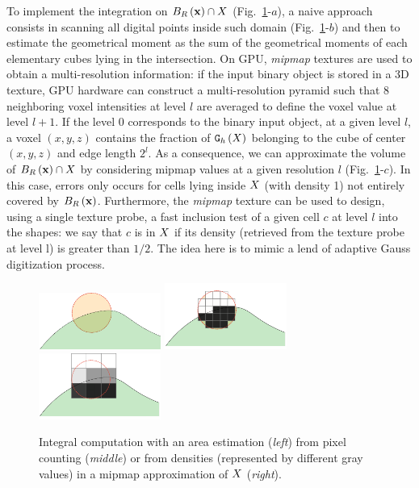 \documentclass{llncs}
\begin{document}
To implement the integration on $B_{R}\left(\mathbf{x}\right) \cap X$
(Fig.~\ref{fig:approx}-$a$), a naive approach consists in scanning all digital
points inside such domain (Fig.~\ref{fig:approx}-$b$) and then to estimate the
geometrical moment as the sum of the geometrical moments of each elementary
cubes lying in the intersection. On GPU, \emph{mipmap} textures are used to
obtain a multi-resolution information: if the input binary object is stored in a
3D texture, GPU hardware can construct a multi-resolution pyramid such that 8
neighboring voxel intensities at level $l$ are averaged to define the voxel
value at level $l+1$. If the level 0 corresponds to the binary input object, at
a given level $l$, a voxel $(x,y,z)$ contains the fraction of $\mathtt{G}_{h}\left(X\right)$ belonging
to the cube of center $(x,y,z)$ and edge length $2^l$. As a consequence, we can
approximate the volume of $B_{R}\left(\mathbf{x}\right)\cap X$ by considering mipmap values
at a given resolution $l$ (Fig.~\ref{fig:approx}-$c$). In this case, errors only
occurs for cells lying inside $X$ (with density 1) not entirely covered by
$B_{R}\left(\mathbf{x}\right)$. Furthermore, the \emph{mipmap} texture can be used to design,
using a single texture probe, a fast inclusion test of a given cell $c$ at level
$l$ into the shapes: we say that $c$ is in $X$ if its density (retrieved
from the texture probe at level l) is greater than $1/2$. The idea here is to
mimic a lend of adaptive Gauss digitization process.

\begin{figure}
  \vspace{-0.35cm}
  \begin{center}
    {\includegraphics[width=4cm]{figs/approx1}}
    {\includegraphics[width=4cm]{figs/approx-reg-1}}
    {\includegraphics[width=4cm]{figs/approx-reg-2}}
  \end{center}
  \vspace{-0.35cm}
  \caption{Integral computation with an area estimation (\emph{left}) from pixel
    counting (\emph{middle}) or from densities (represented by different
    gray values) in a mipmap approximation of $X$ (\emph{right}).}
  \label{fig:approx}
  \vspace{-0.35cm}
\end{figure}
\end{document}

